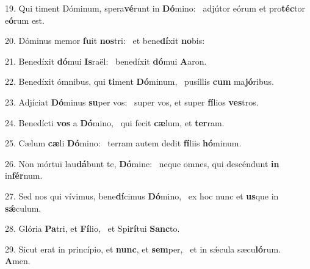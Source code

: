 19. Qui timent Dóminum, spera\textbf{vé}runt in \textbf{Dó}mino: \ast\  adjútor eórum et pro\textbf{téc}tor e\textbf{ó}rum est.\

20. Dóminus memor \textbf{fu}it \textbf{nos}tri: \ast\  et bene\textbf{dí}xit \textbf{no}bis:\

21. Benedíxit \textbf{dó}mui \textbf{Is}raël: \ast\  benedíxit \textbf{dó}mui \textbf{A}aron.\

22. Benedíxit ómnibus, qui \textbf{ti}ment \textbf{Dó}minum, \ast\  pusíllis \textbf{cum} ma\textbf{jó}ribus.\

23. Adjíciat \textbf{Dó}minus \textbf{su}per vos: \ast\  super vos, et super \textbf{fí}lios \textbf{ves}tros.\

24. Benedícti \textbf{vos} a \textbf{Dó}mino, \ast\  qui fecit \textbf{cæ}lum, et \textbf{ter}ram.\

25. Cælum \textbf{cæ}li \textbf{Dó}mino: \ast\  terram autem dedit \textbf{fí}liis \textbf{hó}minum.\

26. Non mórtui lau\textbf{dá}bunt te, \textbf{Dó}mine: \ast\  neque omnes, qui descéndunt \textbf{in} in\textbf{fér}num.\

27. Sed nos qui vívimus, bene\textbf{dí}cimus \textbf{Dó}mino, \ast\  ex hoc nunc et \textbf{us}que in \textbf{sǽ}culum.\

28. Glória \textbf{Pa}tri, et \textbf{Fí}lio, \ast\  et Spi\textbf{rí}tui \textbf{Sanc}to.\

29. Sicut erat in princípio, et \textbf{nunc}, et \textbf{sem}per, \ast\  et in sǽcula sæcu\textbf{ló}rum. \textbf{A}men.\


